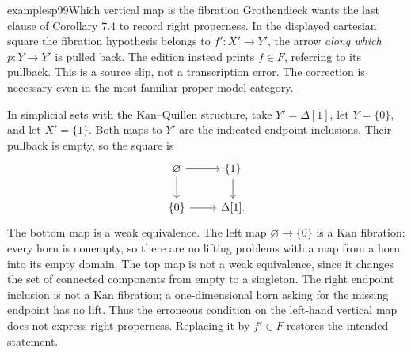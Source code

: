 \begin{dcomment}{examples}{p99}{Which vertical map is the fibration}
Grothendieck wants the last clause of Corollary 7.4 to record right properness. In the displayed cartesian square the fibration hypothesis belongs to $f':X'\to Y'$, the arrow \emph{along which} $p:Y\to Y'$ is pulled back. The edition instead prints $f\in F$, referring to its pullback. This is a source slip, not a transcription error. The correction is necessary even in the most familiar proper model category.

In simplicial sets with the Kan--Quillen structure, take $Y'=\Delta[1]$, let $Y=\{0\}$, and let $X'=\{1\}$. Both maps to $Y'$ are the indicated endpoint inclusions. Their pullback is empty, so the square is
\[
\begin{tikzcd}
\varnothing\arrow[r]\arrow[d] & \{1\}\arrow[d]\\
\{0\}\arrow[r] & \Delta[1].
\end{tikzcd}
\]
The bottom map is a weak equivalence. The left map $\varnothing\to\{0\}$ is a Kan fibration: every horn is nonempty, so there are no lifting problems with a map from a horn into its empty domain. The top map is not a weak equivalence, since it changes the set of connected components from empty to a singleton. The right endpoint inclusion is not a Kan fibration; a one-dimensional horn asking for the missing endpoint has no lift. Thus the erroneous condition on the left-hand vertical map does not express right properness. Replacing it by $f'\in F$ restores the intended statement.
\end{dcomment}

